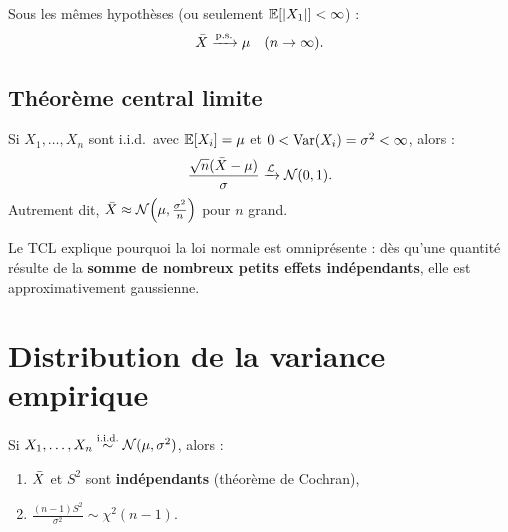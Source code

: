 \begin{theoreme}
Sous les m\^emes hypoth\`eses (ou seulement $\mathbb{E}[|X_1|]<\infty$) :
\[
\bar{X} \xrightarrow{\text{p.s.}} \mu \quad (n\to\infty).
\]
\end{theoreme}

\subsection{Th\'eor\`eme central limite}

\begin{theoreme}
\label{thm:tcl}
Si $X_1,\ldots,X_n$ sont i.i.d.\ avec $\mathbb{E}[X_i]=\mu$ et $0<\operatorname{Var}(X_i)=\sigma^2<\infty$, alors :
\[
\frac{\sqrt{n}(\bar{X}-\mu)}{\sigma} \xrightarrow{\mathcal{L}} \mathcal{N}(0,1).
\]
Autrement dit, $\bar{X} \approx \mathcal{N}\!\left(\mu,\frac{\sigma^2}{n}\right)$ pour $n$ grand.
\end{theoreme}

\begin{intuition}
Le TCL explique pourquoi la loi normale est omnipr\'esente : d\`es qu'une quantit\'e r\'esulte de la \textbf{somme de nombreux petits effets ind\'ependants}, elle est approximativement gaussienne.
\end{intuition}

\begin{center}
\end{center}

\section{Distribution de la variance empirique}

\begin{theoreme}
\label{thm:loi-s2}
Si $X_1,\ldots,X_n\overset{\text{i.i.d.}}{\sim}\mathcal{N}(\mu,\sigma^2)$, alors :
\begin{enumerate}
\item $\bar{X}$ et $S^2$ sont \textbf{ind\'ependants} (th\'eor\`eme de Cochran),
\item $\displaystyle\frac{(n-1)S^2}{\sigma^2}\sim\chi^2(n-1)$.
\end{enumerate}
\end{theoreme}

